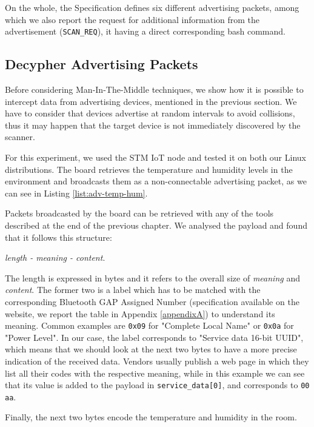 On the whole, the Specification defines six different advertising packets, among which we also report the request for additional information from the advertisement (\texttt{SCAN\_REQ}), it having a direct corresponding bash command.

\subsection{Decypher Advertising Packets}
Before considering Man-In-The-Middle techniques, we show how it is possible to intercept data from advertising devices, mentioned in the previous section. We have to consider that devices advertise at random intervals to avoid collisions, thus it may happen that the target device is not immediately discovered by the scanner.

For this experiment, we used the STM IoT node and tested it on both our Linux distributions. The board retrieves the temperature and humidity levels in the environment and broadcasts them as a non-connectable advertising packet, as we can see in Listing \ref{list:adv-temp-hum}.


Packets broadcasted by the board can be retrieved with any of the tools described at the end of the previous chapter. We analysed the payload and found that it follows this structure:
\begin{center}
	\textit{length - meaning - content}.
\end{center}
The length is expressed in bytes and it refers to the overall size of \textit{meaning} and \textit{content}. The former two is a label which has to be matched with the corresponding Bluetooth GAP Assigned Number (specification available on the website, we report the table in Appendix \ref{appendixA}) to understand its meaning. Common examples are \texttt{0x09} for "Complete Local Name" or \texttt{0x0a} for "Power Level". In our case, the label corresponds to "Service data 16-bit UUID", which means that we should look at the next two bytes to have a more precise indication of the received data. Vendors usually publish a web page in which they list all their codes with the respective meaning, while in this example we can see that its value is added to the payload in \texttt{service\_data[0]}, and corresponds to \texttt{00 aa}.

Finally, the next two bytes encode the temperature and humidity in the room.

